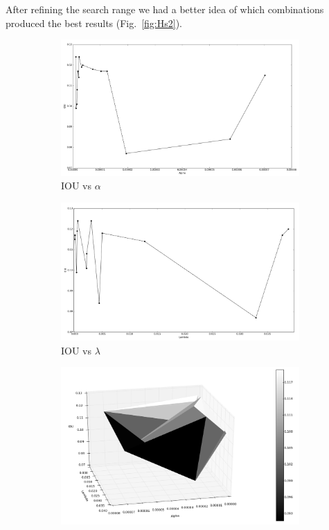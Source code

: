 After refining the search range we had a better idea of which combinations produced the best results (Fig.~\ref{fig:Hs2}).
\begin{figure}[h]
	\centering
	\begin{subfigure}{0.32\textwidth}
		\centering
                \includegraphics[width=\textwidth]{plots/hs2_alpha.png}
         \caption{IOU vs $\alpha$}
	\end{subfigure}
	\begin{subfigure}{0.32\textwidth}
		\centering
                \includegraphics[width=\textwidth]{plots/hs2_lambda.png}
         \caption{IOU vs $\lambda$}
	\end{subfigure}
	\begin{subfigure}{0.32\textwidth}
		\centering
                \includegraphics[width=\textwidth]{plots/hs2_trisurface.png}

\end{subfigure}
\end{figure}
